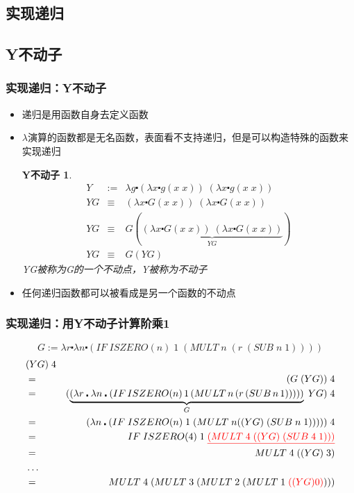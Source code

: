 \documentclass[CJK,compress,hyperref]{beamer}
\begin{document}
\begin{CJK}{UTF8}{song}
\section{实现递归} 
\subsection{Y不动子}
\begin{frame}
  \frametitle{实现递归：Y不动子} 
  \begin{itemize}
  \item 递归是用函数自身去定义函数 
  \item $\lambda$演算的函数都是无名函数，表面看不支持递归，但是可以构造特殊的函数来实现递归
    \newtheorem{YComb}{Y不动子} 
    \begin{YComb}
      \begin{eqnarray*}
        Y & := & \lambda g \centerdot (\lambda x \centerdot g(x \;x)) \; (\lambda x \centerdot g(x \;x)) \\ 
        YG & \equiv & (\lambda x \centerdot G(x \;x)) \;  (\lambda x \centerdot G(x \;x)) \\ 
        YG & \equiv & G (\underbrace{(\lambda x \centerdot G(x \;x)) \;  (\lambda x \centerdot G(x \;x))}_{YG}) \\ 
        YG & \equiv & G(YG) 
      \end{eqnarray*} 
      YG被称为G的一个不动点，Y被称为不动子
    \end{YComb}
  \item  {\color{red}任何递归函数都可以被看成是另一个函数的不动点}
  \end{itemize}
\end{frame}

\begin{frame}
  \frametitle{实现递归：用Y不动子计算阶乘1} 
  \begin{displaymath}
    G  := \lambda r \centerdot \lambda n \centerdot (IF \; ISZERO(n) \; 1 \; (MULT \; n \; (r \; (SUB \; n \;1)))) 
  \end{displaymath}
  \begin{eqnarray*}
    & (YG) \; 4  & \\
    & =  &  (G \; (YG)) \; 4 \\  
    & =  & (\underbrace{(\lambda r \centerdot \lambda n \centerdot  (IF \, ISZERO(n) \, 1 \, (MULT \, n \, (r \, (SUB \, n \,1)))))}_G \; YG) \; 4 \\
    & =  & (\lambda n \centerdot (IF \; ISZERO(n) \; 1 \; (MULT \; n ((YG) \; (SUB \; n \; 1))))) \;4 \\
    & =  & IF \; ISZERO(4) \; 1 \; {\color{red}\underline{(MULT \; 4 \; ((YG) \; (SUB \;4 \;1)))}} \\
    & =  & MULT \; 4 \; ((YG) \;3)  \\ 
    & \dots & \\ 
    & = & MULT \; 4 \; (MULT \; 3 \; (MULT \; 2 \; (MULT \; 1 \; {\color{red}((YG) 0)})))   
  \end{eqnarray*}
\end{frame}


\end{CJK}
\end{document}
